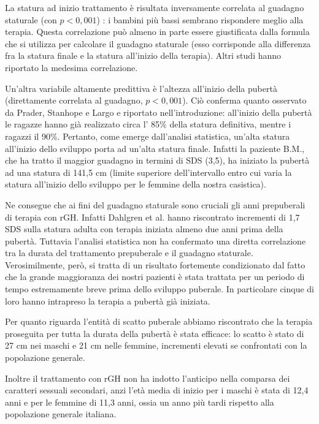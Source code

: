La statura ad inizio trattamento è risultata inversamente correlata al guadagno staturale (con $p < 0,001$) : i bambini più bassi sembrano rispondere meglio alla terapia. Questa correlazione può almeno in parte essere giustificata dalla formula che si utilizza per calcolare il guadagno staturale (esso corrisponde alla differenza fra la statura finale e la statura all'inizio della terapia). Altri studi hanno riportato la medesima correlazione\cite{de2005growth,de2000growth}.

Un'altra variabile altamente predittiva è l'altezza all'inizio della pubertà (direttamente correlata al guadagno, $p < 0,001$). Ciò conferma quanto osservato da Prader\cite{gasser1985human}, Stanhope\cite{stanhope1988new} e Largo \cite{gasser2001growth} e riportato nell'introduzione: 
 all'inizio della pubertà le ragazze hanno già realizzato circa l' 85\% della statura definitiva, mentre i ragazzi il 90\%. Pertanto, come emerge dall'analisi statistica, un'alta statura all'inizio dello sviluppo porta ad un'alta statura finale. Infatti la paziente B.M., che ha tratto il maggior guadagno in termini di SDS (3,5), ha iniziato la pubertà ad una statura di 141,5 cm (limite superiore dell'intervallo entro cui varia la statura all'inizio dello sviluppo per le femmine della nostra casistica).
 
Ne consegue che ai fini del guadagno staturale sono cruciali gli anni prepuberali di terapia con rGH. Infatti Dahlgren et al. hanno riscontrato incrementi di 1,7 SDS sulla statura adulta con terapia iniziata almeno due anni prima della pubertà\cite{dahlgren2005final}. Tuttavia l'analisi statistica non ha confermato una diretta correlazione tra la durata del trattamento prepuberale e il guadagno staturale. Verosimilmente, però, si tratta di un risultato fortemente condizionato dal fatto che la grande maggioranza dei nostri pazienti è stata trattata per un periodo di tempo estremamente breve prima dello sviluppo puberale. In particolare cinque di loro hanno intrapreso la terapia a pubertà già iniziata.

Per quanto riguarda l'entità di scatto puberale abbiamo riscontrato che la terapia proseguita per tutta la durata della pubertà è stata efficace: lo scatto è stato di 27 cm nei maschi e 21 cm nelle femmine, incrementi elevati se confrontati con la popolazione generale\cite{tanner1990foetus}. 

Inoltre il trattamento con rGH non ha indotto l'anticipo nella comparsa dei caratteri sessuali secondari, anzi l'età media di inizio per i maschi è stata di 12,4 anni e per le femmine di 11,3 anni, ossia un anno più tardi rispetto alla popolazione generale italiana\cite{benso1989distribution}.

